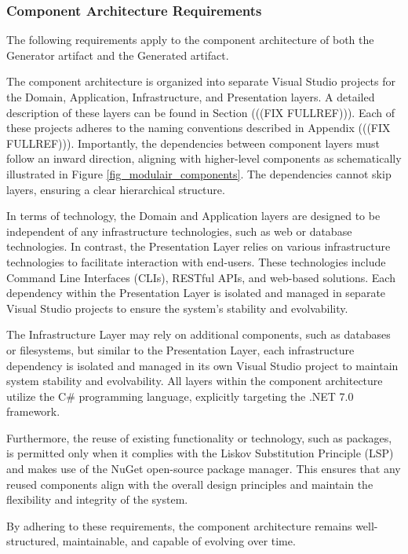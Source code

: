 \subsubsection{Component Architecture Requirements} \label{component_requirements}

The following requirements apply to the component architecture of both the Generator
artifact and the Generated artifact.

The component architecture is organized into separate Visual Studio projects for the
Domain, Application, Infrastructure, and Presentation layers. A detailed description of
these layers can be found in Section (((FIX FULLREF))). Each of these projects adheres to
the naming conventions described in Appendix (((FIX FULLREF))). Importantly, the
dependencies between component layers must follow an inward direction, aligning with
higher-level components as schematically illustrated in Figure
\ref{fig_modulair_components}. The dependencies cannot skip layers, ensuring a clear
hierarchical structure.

In terms of technology, the Domain and Application layers are designed to be independent
of any infrastructure technologies, such as web or database technologies. In contrast, the
Presentation Layer relies on various infrastructure technologies to facilitate interaction
with end-users. These technologies include Command Line Interfaces (CLIs), RESTful APIs,
and web-based solutions. Each dependency within the Presentation Layer is isolated and
managed in separate Visual Studio projects to ensure the system's stability and
evolvability.

The Infrastructure Layer may rely on additional components, such as databases or
filesystems, but similar to the Presentation Layer, each infrastructure dependency is
isolated and managed in its own Visual Studio project to maintain system stability and
evolvability. All layers within the component architecture utilize the C\# programming
language, explicitly targeting the .NET 7.0 framework.

Furthermore, the reuse of existing functionality or technology, such as packages, is
permitted only when it complies with the Liskov Substitution Principle (LSP) and makes use
of the NuGet open-source package manager. This ensures that any reused components align
with the overall design principles and maintain the flexibility and integrity of the
system.

By adhering to these requirements, the component architecture remains well-structured,
maintainable, and capable of evolving over time.
